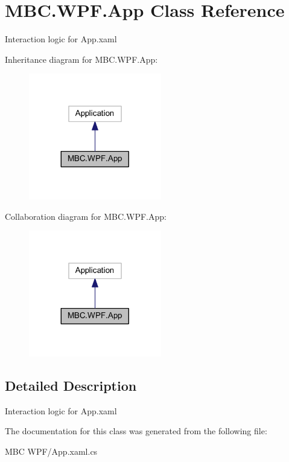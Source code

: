 \hypertarget{class_m_b_c_1_1_w_p_f_1_1_app}{\section{M\-B\-C.\-W\-P\-F.\-App Class Reference}
\label{class_m_b_c_1_1_w_p_f_1_1_app}
}


Interaction logic for App.\-xaml  




Inheritance diagram for M\-B\-C.\-W\-P\-F.\-App\-:
\nopagebreak
\begin{figure}[H]
\begin{center}
\leavevmode
\includegraphics[width=164pt]{class_m_b_c_1_1_w_p_f_1_1_app__inherit__graph}
\end{center}
\end{figure}


Collaboration diagram for M\-B\-C.\-W\-P\-F.\-App\-:
\nopagebreak
\begin{figure}[H]
\begin{center}
\leavevmode
\includegraphics[width=164pt]{class_m_b_c_1_1_w_p_f_1_1_app__coll__graph}
\end{center}
\end{figure}


\subsection{Detailed Description}
Interaction logic for App.\-xaml 



The documentation for this class was generated from the following file\-:\begin{DoxyCompactItemize}
\item 
M\-B\-C W\-P\-F/App.\-xaml.\-cs\end{DoxyCompactItemize}
